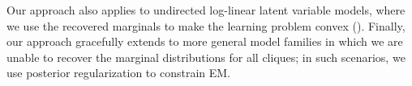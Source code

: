 Our approach also applies to undirected log-linear latent variable
  models, where we use the recovered marginals to make the learning
  problem convex ().
Finally, our approach gracefully extends to more general model families
  in which we are unable to recover the marginal distributions for all
  cliques; in such scenarios, we use posterior regularization to constrain
  EM. 
